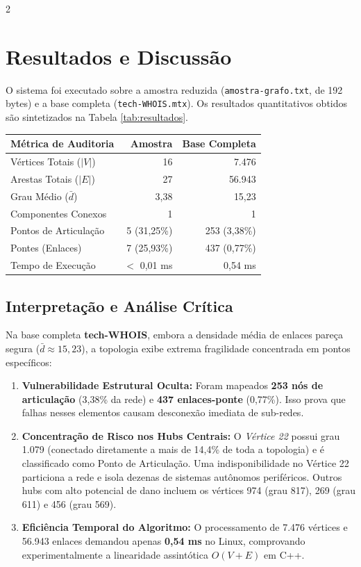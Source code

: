 \documentclass[10pt,a4paper]{article}
\begin{document}
\begin{multicols}{2}
\section{Resultados e Discussão}
O sistema foi executado sobre a amostra reduzida (\texttt{amostra-grafo.txt}, de 192 bytes) e a base completa (\texttt{tech-WHOIS.mtx}). Os resultados quantitativos obtidos são sintetizados na Tabela \ref{tab:resultados}.

\begin{center}
\small
{}
\label{tab:resultados}
\begin{tabular}{lrr}
\toprule
\textbf{Métrica de Auditoria} & \textbf{Amostra} & \textbf{Base Completa} \\
\midrule
Vértices Totais ($|V|$) & 16 & 7.476 \\
Arestas Totais ($|E|$) & 27 & 56.943 \\
Grau Médio ($\bar{d}$) & 3,38 & 15,23 \\
Componentes Conexos & 1 & 1 \\
Pontos de Articulação & 5 (31,25\%) & 253 (3,38\%) \\
Pontes (Enlaces) & 7 (25,93\%) & 437 (0,77\%) \\
Tempo de Execução & $<$ 0,01 ms & 0,54 ms \\
\bottomrule
\end{tabular}
\end{center}

\subsection{Interpretação e Análise Crítica}
Na base completa \textbf{tech-WHOIS}, embora a densidade média de enlaces pareça segura ($\bar{d} \approx 15{,}23$), a topologia exibe extrema fragilidade concentrada em pontos específicos:
\begin{enumerate}
    \setlength{\itemsep}{0pt}
    \item \textbf{Vulnerabilidade Estrutural Oculta:} Foram mapeados \textbf{253 nós de articulação} (3,38\% da rede) e \textbf{437 enlaces-ponte} (0,77\%). Isso prova que falhas nesses elementos causam desconexão imediata de sub-redes.
    \item \textbf{Concentração de Risco nos Hubs Centrais:} O \textit{Vértice 22} possui grau 1.079 (conectado diretamente a mais de 14,4\% de toda a topologia) e é classificado como Ponto de Articulação. Uma indisponibilidade no Vértice 22 particiona a rede e isola dezenas de sistemas autônomos periféricos. Outros hubs com alto potencial de dano incluem os vértices 974 (grau 817), 269 (grau 611) e 456 (grau 569).
    \item \textbf{Eficiência Temporal do Algoritmo:} O processamento de 7.476 vértices e 56.943 enlaces demandou apenas \textbf{0,54 ms} no Linux, comprovando experimentalmente a linearidade assintótica $O(V + E)$ em C++.
\end{enumerate}


\end{multicols}
\end{document}
